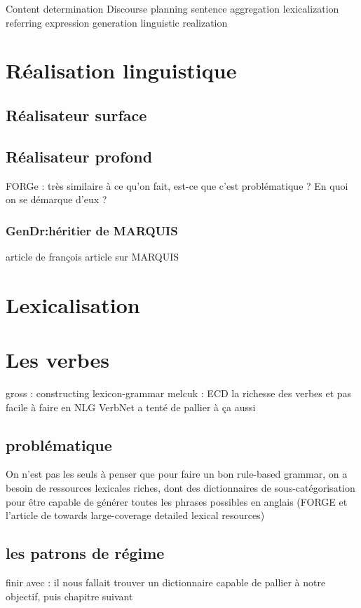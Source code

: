 Content determination
Discourse planning
sentence aggregation
lexicalization
referring expression generation
linguistic realization

\section{Réalisation linguistique}

\subsection{Réalisateur surface}

\subsection{Réalisateur profond}
FORGe : très similaire à ce qu'on fait, est-ce que c'est problématique ? En quoi on se démarque d'eux ?
\subsubsection{GenDr:héritier de MARQUIS}

article de françois
article sur MARQUIS


\section{Lexicalisation}

\section{Les verbes}

gross : constructing lexicon-grammar
melcuk : ECD
la richesse des verbes et pas facile à faire en NLG
VerbNet a tenté de pallier à ça aussi

\subsection{problématique}

On n'est pas les seuls à penser que pour faire un bon rule-based grammar, on a besoin de ressources lexicales riches, dont des dictionnaires de sous-catégorisation pour être capable de générer toutes les phrases possibles en anglais (FORGE et l'article de towards large-coverage detailed lexical resources)

\subsection{les patrons de régime}

finir avec : il nous fallait trouver un dictionnaire capable de pallier à notre objectif, puis chapitre suivant
